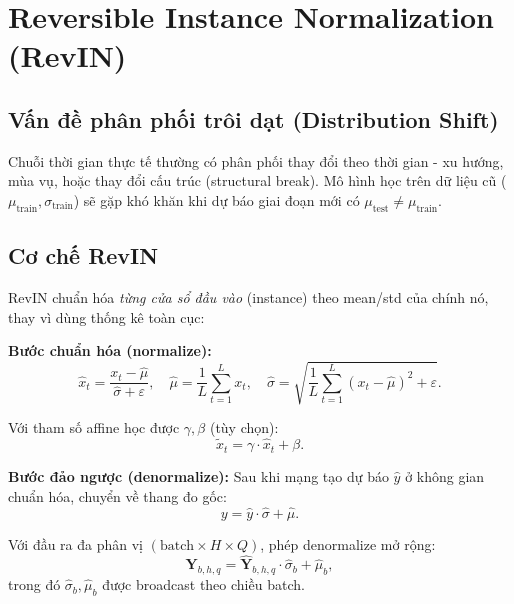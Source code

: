 \documentclass[12pt, a4paper]{report}
\begin{document}
\section{Reversible Instance Normalization (RevIN)}
\label{sec:revin_theory_ref}

\subsection{Vấn đề phân phối trôi dạt (Distribution Shift)}

Chuỗi thời gian thực tế thường có phân phối thay đổi theo thời gian - xu hướng, mùa vụ, hoặc thay đổi cấu trúc (structural break). Mô hình học trên dữ liệu cũ ($\mu_{\text{train}}, \sigma_{\text{train}}$) sẽ gặp khó khăn khi dự báo giai đoạn mới có $\mu_{\text{test}} \neq \mu_{\text{train}}$.

\subsection{Cơ chế RevIN}

RevIN \cite{kim2022reversible} chuẩn hóa \textit{từng cửa sổ đầu vào} (instance) theo mean/std của chính nó, thay vì dùng thống kê toàn cục:

\textbf{Bước chuẩn hóa (normalize):}
\begin{equation}
  \hat{x}_t = \frac{x_t - \hat{\mu}}{\hat{\sigma} + \varepsilon}, \quad
  \hat{\mu} = \frac{1}{L}\sum_{t=1}^{L} x_t, \quad
  \hat{\sigma} = \sqrt{\frac{1}{L}\sum_{t=1}^{L}(x_t - \hat{\mu})^2 + \varepsilon}.
\end{equation}

Với tham số affine học được $\gamma, \beta$ (tùy chọn):
\begin{equation}
  \tilde{x}_t = \gamma \cdot \hat{x}_t + \beta.
\end{equation}

\textbf{Bước đảo ngược (denormalize):} Sau khi mạng tạo dự báo $\hat{y}$ ở không gian chuẩn hóa, chuyển về thang đo gốc:
\begin{equation}
  y = \hat{y} \cdot \hat{\sigma} + \hat{\mu}.
\end{equation}

Với đầu ra đa phân vị $(\text{batch} \times H \times Q)$, phép denormalize mở rộng:
\begin{equation}
  \mathbf{Y}_{b,h,q} = \hat{\mathbf{Y}}_{b,h,q} \cdot \hat{\sigma}_b + \hat{\mu}_b,
\end{equation}
trong đó $\hat{\sigma}_b, \hat{\mu}_b$ được broadcast theo chiều batch.
\end{document}
